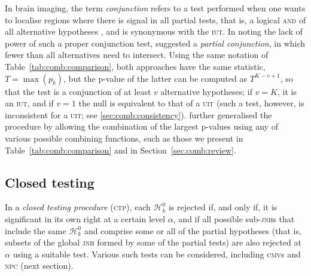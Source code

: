 In brain imaging, the term \emph{conjunction} refers to a test performed when one wants to localise regions where there is signal in all partial tests, that is, a logical \textsc{and} of all alternative hypotheses \citep{Nichols2005}, and is synonymous with the \textsc{iut}. In noting the lack of power of such a proper conjunction test, \citet{Friston2005} suggested a \emph{partial conjunction}, in which fewer than all alternatives need to intersect. Using the same notation of Table~\ref{tab:comb:comparison}, both approaches have the same statistic, $T = \max \left(p_{k}\right)$, but the p-value of the latter can be computed as $T^{K-v+1}$, so that the test is a conjunction of at least $v$ alternative hypotheses; if $v=K$, it is an \textsc{iut}, and if $v=1$ the null is equivalent to that of a \textsc{uit} (such a test, however, is inconsistent for a \textsc{uit}; see \ref{sec:comb:consistency}). \citet{Benjamini2008} further generalised the procedure by allowing the combination of the largest p-values using any of various possible combining functions, such as those we present in Table~\ref{tab:comb:comparison} and in Section~\ref{sec:comb:review}.

\subsection{Closed testing}
\label{sec:comb:ctp}

In a \emph{closed testing procedure} (\textsc{ctp}), each $\mathcal{H}^0_k$ is rejected if, and only if, it is significant in its own right at a certain level $\alpha$, and if all possible sub-\textsc{jnh}s that include the same $\mathcal{H}^0_k$ and comprise some or all of the partial hypotheses (that is, subsets of the global \textsc{jnh} formed by some of the partial tests) are also rejected at $\alpha$ using a suitable test. Various such tests can be considered, including \textsc{cmv}s and \textsc{npc} (next section).

